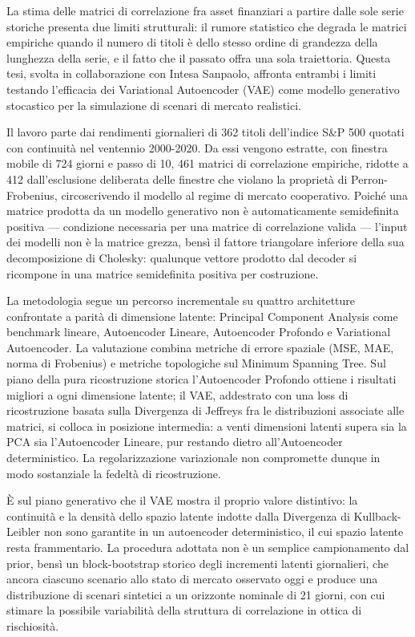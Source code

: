 La stima delle matrici di correlazione fra asset finanziari a partire dalle sole serie storiche presenta due limiti strutturali: il rumore statistico che degrada le matrici empiriche quando il numero di titoli è dello stesso ordine di grandezza della lunghezza della serie, e il fatto che il passato offra una sola traiettoria. Questa tesi, svolta in collaborazione con Intesa Sanpaolo, affronta entrambi i limiti testando l'efficacia dei Variational Autoencoder (VAE) come modello generativo stocastico per la simulazione di scenari di mercato realistici.

Il lavoro parte dai rendimenti giornalieri di 362 titoli dell'indice S\&P 500 quotati con continuità nel ventennio 2000-2020. Da essi vengono estratte, con finestra mobile di 724 giorni e passo di 10, 461 matrici di correlazione empiriche, ridotte a 412 dall'esclusione deliberata delle finestre che violano la proprietà di Perron-Frobenius, circoscrivendo il modello al regime di mercato cooperativo. Poiché una matrice prodotta da un modello generativo non è automaticamente semidefinita positiva --- condizione necessaria per una matrice di correlazione valida --- l'input dei modelli non è la matrice grezza, bensì il fattore triangolare inferiore della sua decomposizione di Cholesky: qualunque vettore prodotto dal decoder si ricompone in una matrice semidefinita positiva per costruzione.

La metodologia segue un percorso incrementale su quattro architetture confrontate a parità di dimensione latente: Principal Component Analysis come benchmark lineare, Autoencoder Lineare, Autoencoder Profondo e Variational Autoencoder. La valutazione combina metriche di errore spaziale (MSE, MAE, norma di Frobenius) e metriche topologiche sul Minimum Spanning Tree. Sul piano della pura ricostruzione storica l'Autoencoder Profondo ottiene i risultati migliori a ogni dimensione latente; il VAE, addestrato con una loss di ricostruzione basata sulla Divergenza di Jeffreys fra le distribuzioni associate alle matrici, si colloca in posizione intermedia: a venti dimensioni latenti supera sia la PCA sia l'Autoencoder Lineare, pur restando dietro all'Autoencoder deterministico. La regolarizzazione variazionale non compromette dunque in modo sostanziale la fedeltà di ricostruzione.

È sul piano generativo che il VAE mostra il proprio valore distintivo: la continuità e la densità dello spazio latente indotte dalla Divergenza di Kullback-Leibler non sono garantite in un autoencoder deterministico, il cui spazio latente resta frammentario. La procedura adottata non è un semplice campionamento dal prior, bensì un block-bootstrap storico degli incrementi latenti giornalieri, che ancora ciascuno scenario allo stato di mercato osservato oggi e produce una distribuzione di scenari sintetici a un orizzonte nominale di 21 giorni, con cui stimare la possibile variabilità della struttura di correlazione in ottica di rischiosità.

